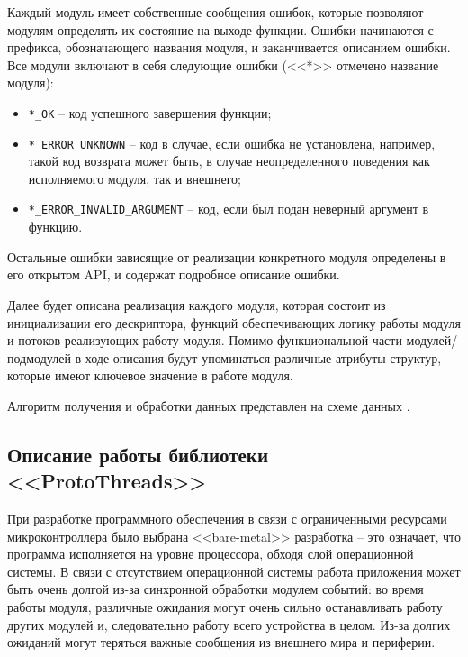 Каждый модуль имеет собственные сообщения ошибок, которые позволяют модулям определять их состояние на выходе функции.
Ошибки начинаются с префикса, обозначающего названия модуля, и заканчивается описанием ошибки. Все модули включают в себя следующие
ошибки (<<*>> отмечено название модуля):

\begin{itemize}
    \item \lstinline{*_OK} -- код успешного завершения функции;
    \item \lstinline{*_ERROR_UNKNOWN} -- код в случае, если ошибка не установлена, например, 
    такой код возврата может быть, в случае неопределенного поведения как исполняемого модуля, так и внешнего;
    \item \lstinline{*_ERROR_INVALID_ARGUMENT} -- код, если был подан неверный аргумент в функцию.
\end{itemize}

Остальные ошибки зависящие от реализации конкретного модуля определены в его открытом API, и содержат подробное описание ошибки.

Далее будет описана реализация каждого модуля, которая состоит из инициализации его дескриптора, функций обеспечивающих логику работы модуля
и потоков реализующих работу модуля. Помимо функциональной части модулей/подмодулей в ходе описания будут упоминаться различные атрибуты структур,
которые имеют ключевое значение в работе модуля.

Алгоритм получения и обработки данных представлен на схеме
данных \dataScheme. 

\subsection{Описание работы библиотеки <<ProtoThreads>>}
При разработке программного обеспечения в связи с ограниченными ресурсами микроконтроллера было выбрана <<bare-metal>>
разработка -- это означает, что программа исполняется на уровне процессора, обходя слой операционной системы.
В связи с отсутствием операционной системы работа приложения может быть очень долгой из-за синхронной обработки модулем событий:
во время работы модуля, различные ожидания могут очень сильно останавливать работу других модулей и, следовательно работу всего устройства в целом.
Из-за долгих ожиданий могут теряться важные сообщения из внешнего мира и периферии.

